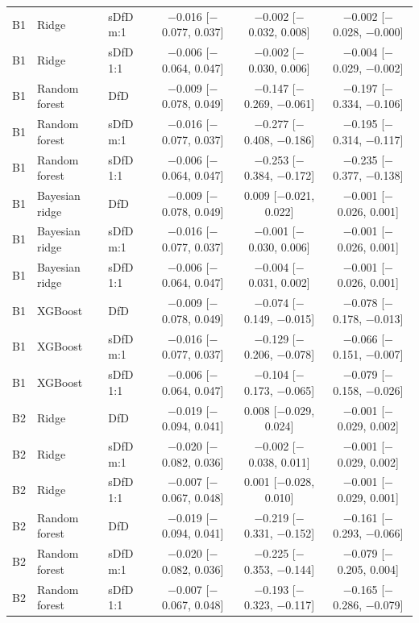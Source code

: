 \begin{longtable}{lllccc}
B1 & Ridge & sDfD m:1 & $-$0.016 [$-$0.077, 0.037] & $-$0.002 [$-$0.032, 0.008] & $-$0.002 [$-$0.028, $-$0.000] \\
B1 & Ridge & sDfD 1:1 & $-$0.006 [$-$0.064, 0.047] & $-$0.002 [$-$0.030, 0.006] & $-$0.004 [$-$0.029, $-$0.002] \\
B1 & Random forest & DfD & $-$0.009 [$-$0.078, 0.049] & $-$0.147 [$-$0.269, $-$0.061] & $-$0.197 [$-$0.334, $-$0.106] \\
B1 & Random forest & sDfD m:1 & $-$0.016 [$-$0.077, 0.037] & $-$0.277 [$-$0.408, $-$0.186] & $-$0.195 [$-$0.314, $-$0.117] \\
B1 & Random forest & sDfD 1:1 & $-$0.006 [$-$0.064, 0.047] & $-$0.253 [$-$0.384, $-$0.172] & $-$0.235 [$-$0.377, $-$0.138] \\
B1 & Bayesian ridge & DfD & $-$0.009 [$-$0.078, 0.049] & 0.009 [$-$0.021, 0.022] & $-$0.001 [$-$0.026, 0.001] \\
B1 & Bayesian ridge & sDfD m:1 & $-$0.016 [$-$0.077, 0.037] & $-$0.001 [$-$0.030, 0.006] & $-$0.001 [$-$0.026, 0.001] \\
B1 & Bayesian ridge & sDfD 1:1 & $-$0.006 [$-$0.064, 0.047] & $-$0.004 [$-$0.031, 0.002] & $-$0.001 [$-$0.026, 0.001] \\
B1 & XGBoost & DfD & $-$0.009 [$-$0.078, 0.049] & $-$0.074 [$-$0.149, $-$0.015] & $-$0.078 [$-$0.178, $-$0.013] \\
B1 & XGBoost & sDfD m:1 & $-$0.016 [$-$0.077, 0.037] & $-$0.129 [$-$0.206, $-$0.078] & $-$0.066 [$-$0.151, $-$0.007] \\
B1 & XGBoost & sDfD 1:1 & $-$0.006 [$-$0.064, 0.047] & $-$0.104 [$-$0.173, $-$0.065] & $-$0.079 [$-$0.158, $-$0.026] \\
B2 & Ridge & DfD & $-$0.019 [$-$0.094, 0.041] & 0.008 [$-$0.029, 0.024] & $-$0.001 [$-$0.029, 0.002] \\
B2 & Ridge & sDfD m:1 & $-$0.020 [$-$0.082, 0.036] & $-$0.002 [$-$0.038, 0.011] & $-$0.001 [$-$0.029, 0.002] \\
B2 & Ridge & sDfD 1:1 & $-$0.007 [$-$0.067, 0.048] & 0.001 [$-$0.028, 0.010] & $-$0.001 [$-$0.029, 0.001] \\
B2 & Random forest & DfD & $-$0.019 [$-$0.094, 0.041] & $-$0.219 [$-$0.331, $-$0.152] & $-$0.161 [$-$0.293, $-$0.066] \\
B2 & Random forest & sDfD m:1 & $-$0.020 [$-$0.082, 0.036] & $-$0.225 [$-$0.353, $-$0.144] & $-$0.079 [$-$0.205, 0.004] \\
B2 & Random forest & sDfD 1:1 & $-$0.007 [$-$0.067, 0.048] & $-$0.193 [$-$0.323, $-$0.117] & $-$0.165 [$-$0.286, $-$0.079] \\

\end{longtable}
